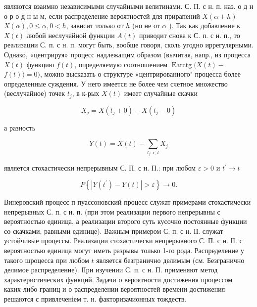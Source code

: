 \documentclass[10pt]{article}
\begin{document}
являются взаимно независимыми случайными велитинами. С. П. с н. п. наз. о д н о р о д н ы м, если распределение вероятностей для прирапений $X(\alpha+h)$ $X(\alpha), 0 \leqslant \alpha, 0<h$, зависит только от $h$ (но не от $\alpha$ ). Так как добавление к $X(t)$ любой неслучайной функции $A(t)$ приводит снова к С. п. с н. п., то реализации С. п. с н. п. могут быть, вообще говоря, сколь угодно иррегулярными. Однако, «центрируя» процесс надлежащим образом (вычитая, напр., из процесса $X(t)$ функцию $f(t)$, определяемую соотношением $\operatorname{Earctg}(X(t)-$ $f(t))=0)$, можно высказать о структуре «центрированного" процесса более определенные суждения. У него имеется не более чем счетное множество (веслучайное) точек $t_{j}$, в к-рых $X(t)$ имеет случайные скачки



\[

X_{j}=X\left(t_{j}+0\right)-X\left(t_{j}-0\right)

\]



а разность



\[

Y(t)=X(t)-\sum_{t_{j}<t} X_{j}

\]



является стохастически непрерывным С. П. с н. П.: при любом $\varepsilon>0$ и $t^{\prime} \rightarrow t$



\[

P\left\{\left|Y\left(t^{\prime}\right)-Y(t)\right|>\varepsilon\right\} \longrightarrow 0 .

\]



Винеровский процесс п пуассоновский процесс служат примерами стохастически непрерывных С. п. с н. п. (при этом реализации первого непрерывны с вероятностью единица, а реализации второго суть кусочно постоянные функции со скачками, равными единице). Важным примером С. п. с н. ІІ. служат устойчивые процессы. Реализации стохастически непрерывного С. П. с н. ІІ. с вероятностью единица могут иметь разрывы только 1-го рода. Распределение у такого шроцесса при любом $t$ является безгранично делимым (см. Безгранично делимое распределение). ІІри изучении С. п. с н. П. применяют метод характеристических функций. Задачи о вероятности достижения процессом каких-либо границ и о распределении вероятностей времени достижения решаются с привлеченіем т. н. факторизачионных тождеств.
\end{document}
